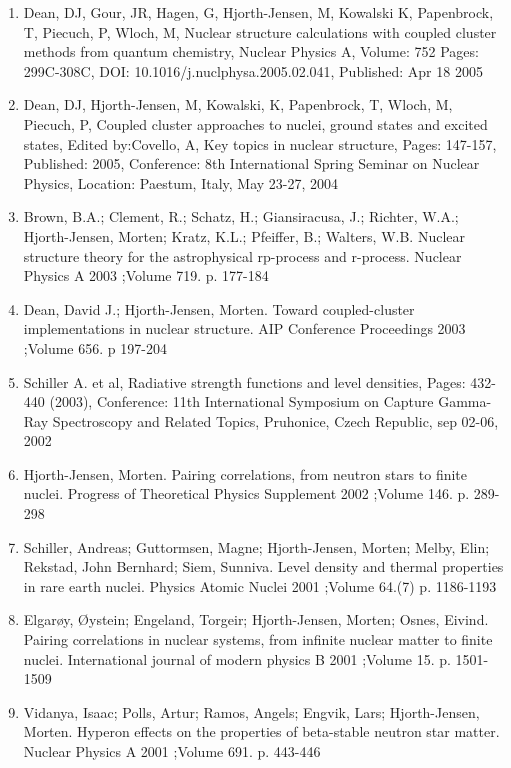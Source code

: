 \documentclass[%
oneside,                 %
final,                   %
10pt]{article}
\begin{document}
\begin{enumerate}
\item Dean, DJ, Gour, JR, Hagen, G, Hjorth-Jensen, M, Kowalski K, Papenbrock, T, Piecuch, P, Wloch, M, Nuclear structure calculations with coupled cluster methods from quantum chemistry, Nuclear Physics A, Volume: 752  Pages: 299C-308C, DOI: 10.1016/j.nuclphysa.2005.02.041, Published: Apr 18 2005

\item Dean, DJ, Hjorth-Jensen, M, Kowalski, K, Papenbrock, T, Wloch, M, Piecuch, P, Coupled cluster approaches to nuclei, ground states and excited states, Edited by:Covello, A, Key topics in nuclear structure, Pages: 147-157, Published: 2005, Conference: 8th International Spring Seminar on Nuclear Physics, Location: Paestum, Italy, May 23-27, 2004

\item Brown, B.A.; Clement, R.; Schatz, H.; Giansiracusa, J.; Richter, W.A.; Hjorth-Jensen, Morten; Kratz, K.L.; Pfeiffer, B.; Walters, W.B.  Nuclear structure theory for the astrophysical rp-process and r-process. Nuclear Physics A 2003 ;Volume 719. p. 177-184

\item Dean, David J.; Hjorth-Jensen, Morten.  Toward coupled-cluster implementations in nuclear structure. AIP Conference Proceedings 2003 ;Volume 656. p 197-204

\item Schiller A. et al, Radiative strength functions and level densities, Pages: 432-440 (2003), Conference: 11th International Symposium on Capture Gamma-Ray Spectroscopy and Related Topics, Pruhonice, Czech Republic, sep 02-06, 2002

\item Hjorth-Jensen, Morten.  Pairing correlations, from neutron stars to finite nuclei. Progress of Theoretical Physics Supplement 2002 ;Volume 146. p. 289-298

\item Schiller, Andreas; Guttormsen, Magne; Hjorth-Jensen, Morten; Melby, Elin; Rekstad, John Bernhard; Siem, Sunniva. Level density and thermal properties in rare earth nuclei. Physics Atomic Nuclei 2001 ;Volume 64.(7) p. 1186-1193

\item Elgarøy, Øystein; Engeland, Torgeir; Hjorth-Jensen, Morten; Osnes, Eivind.  Pairing correlations in nuclear systems, from infinite nuclear matter to finite nuclei. International journal of modern physics B 2001 ;Volume 15. p. 1501-1509

\item Vidanya, Isaac; Polls, Artur; Ramos, Angels; Engvik, Lars; Hjorth-Jensen, Morten. Hyperon effects on the properties of beta-stable neutron star matter. Nuclear Physics A 2001 ;Volume 691. p. 443-446


\end{enumerate}
\end{document}

